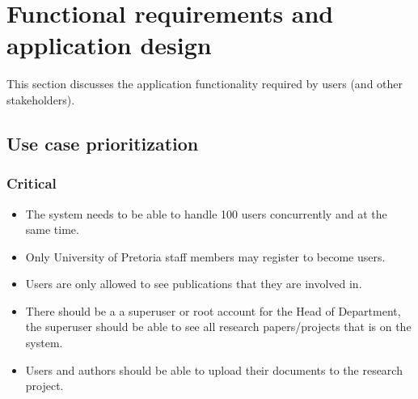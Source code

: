 \documentclass[a4paper,12pt]{report}
\begin{document}
\newpage

\section{Functional requirements and application design}
This section discusses the application functionality required by users (and other stakeholders).
\subsection{Use case prioritization}
\subsubsection{Critical}
	\begin{itemize}
		\item The system needs to be able to handle 100 users concurrently and at the same time.
		\item Only University of Pretoria staff members may register to become users.
		\item Users are only allowed to see publications that they are involved in.
		\item There should be a a superuser or root account for the Head of Department, the superuser should be able to see all research papers/projects that is on the system.
		\item Users and authors should be able to upload their documents to the research project.
	\end{itemize}
\end{document}
